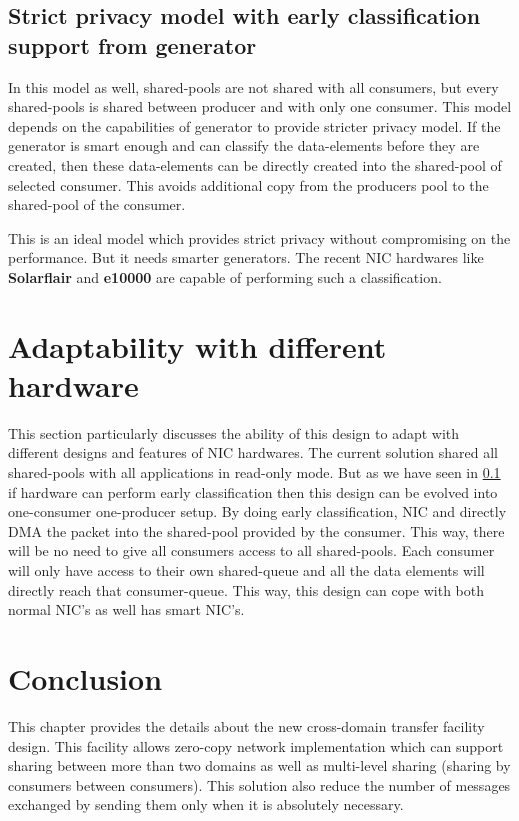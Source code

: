 \documentclass[a4paper,twoside]{report} %
\begin{document}
\subsection{Strict privacy model with early classification support
from generator}
\label{sec:generator-classification-privacy}
In this model as well, shared-pools are not shared with all 
consumers, but every shared-pools is shared between 
producer and with only one consumer. 
This model depends on the capabilities of generator to provide
stricter privacy model.  If the generator is smart enough and can 
classify the data-elements before they are created, then these
data-elements can be directly created into the shared-pool of selected
consumer.  This avoids additional copy from the producers pool to the
shared-pool of the consumer.

This is an ideal model which provides strict privacy without
compromising on the performance.  But it needs smarter generators.
The recent NIC hardwares like \textbf{Solarflair} and \textbf{e10000}
are capable of performing such a classification.


\section{Adaptability with different hardware}
This section particularly discusses the ability of this design to
adapt with different designs and features of NIC hardwares.  The
current solution shared all shared-pools with all applications in 
read-only mode.  But as we have seen in 
\ref{sec:generator-classification-privacy} if hardware can perform 
early classification then
this design can be evolved into one-consumer one-producer setup.  By
doing early classification, NIC and directly DMA the packet into the
shared-pool provided by the consumer.  This way, there will be no need
to give all consumers access to all shared-pools.  Each consumer will
only have access to their own shared-queue and all the data elements
will directly reach that consumer-queue.  This way, this design can
cope with both normal NIC's as well has smart NIC's.


\section{Conclusion}
This chapter provides the details about the new cross-domain transfer
facility design.  This facility allows zero-copy network
implementation which can support sharing between more than two domains
as well as multi-level sharing (sharing by consumers between
consumers).  This solution also reduce the number of messages
exchanged by sending them only when it is absolutely necessary.
\end{document}
